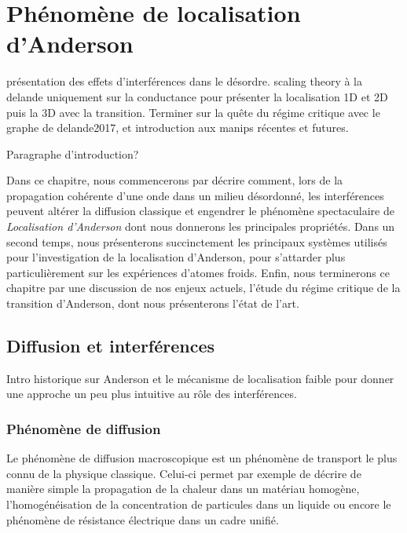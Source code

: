 \chapter{Phénomène de localisation d'Anderson} %

présentation des effets d'interférences dans le désordre. scaling theory à la delande uniquement sur la conductance pour présenter la localisation 1D et 2D puis la 3D avec la transition. Terminer sur la quête du régime critique avec le graphe de delande2017, et introduction aux manips récentes et futures.


Paragraphe d'introduction? 

Dans ce chapitre, nous commencerons par décrire comment, lors de la propagation cohérente d'une onde dans un milieu désordonné, les interférences peuvent altérer la diffusion classique et engendrer le phénomène spectaculaire de \emph{Localisation d'Anderson} dont nous donnerons les principales propriétés. Dans un second temps, nous présenterons succinctement les principaux systèmes utilisés pour l'investigation de la localisation d'Anderson, pour s'attarder plus particulièrement sur les expériences d'atomes froids. Enfin, nous terminerons ce chapitre par une discussion de nos enjeux actuels, l'étude du régime critique de la transition d'Anderson, dont nous présenterons l'état de l'art.

\section{Diffusion et interférences}
Intro historique sur Anderson et le mécanisme de localisation faible pour donner une approche un peu plus intuitive au rôle des interférences.

\subsection{Phénomène de diffusion}
\label{sc:diffusion_classique}
Le phénomène de diffusion macroscopique est un phénomène de transport le plus connu de la physique classique. Celui-ci permet par exemple de décrire de manière simple la propagation de la chaleur dans un matériau homogène, l'homogénéisation de la concentration de particules dans un liquide ou encore le phénomène de résistance électrique dans un cadre unifié. 

